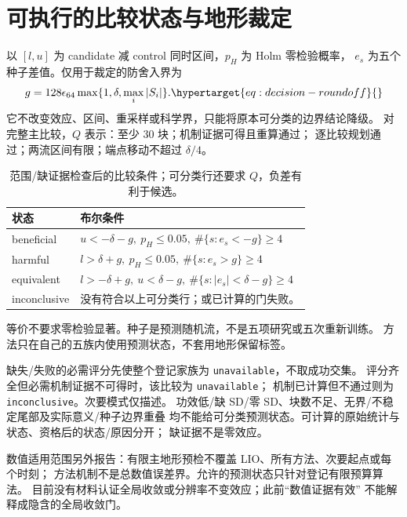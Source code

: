 \section{可执行的比较状态与地形裁定}
\label{sec:decision-conditions}\hypertarget{sec:decision-conditions}{}
以 \([l,u]\) 为 candidate 减 control 同时区间，\(p_H\) 为 Holm 零检验概率，
\(e_s\) 为五个种子差值。仅用于裁定的防舍入界为
\begin{equation}
 g=128\epsilon_{64}\max\{1,\delta,\max_i|S_i|\}.
 \label{eq:decision-roundoff}\hypertarget{eq:decision-roundoff}{}
\end{equation}
它不改变效应、区间、重采样或科学界，只能将原本可分类的边界结论降级。
对完整主比较，\(Q\) 表示：至少 30 块；机制证据可得且重算通过；
逐比较规划通过；两流区间有限；端点移动不超过 \(\delta/4\)。

\begin{table}[htbp]
\centering\small
\caption{范围/缺证据检查后的比较条件；可分类行还要求 \(Q\)，负差有利于候选。}
\label{tab:comparison-conditions}\hypertarget{tab:comparison-conditions}{}
\begin{tabular}{lp{4.8in}}
\toprule
状态 & 布尔条件\\
\midrule
beneficial & \(u<-\delta-g,\ p_H\leq0.05,\ \#\{s:e_s<-g\}\geq4\)\\
harmful & \(l>\delta+g,\ p_H\leq0.05,\ \#\{s:e_s>g\}\geq4\)\\
equivalent & \(l>-\delta+g,\ u<\delta-g,\ \#\{s:|e_s|<\delta-g\}\geq4\)\\
inconclusive & 没有符合以上可分类行；或已计算的门失败。\\
\bottomrule
\end{tabular}
\end{table}

等价不要求零检验显著。种子是预测随机流，不是五项研究或五次重新训练。
方法只在自己的五族内使用预测状态，不套用地形保留标签。

缺失/失败的必需评分先使整个登记家族为 \texttt{unavailable}，不取成功交集。
评分齐全但必需机制证据不可得时，该比较为 \texttt{unavailable}；
机制已计算但不通过则为 \texttt{inconclusive}。次要模式仅描述。
功效低/缺 SD/零 SD、块数不足、无界/不稳定尾部及实际意义/种子边界重叠
均不能给可分类预测状态。可计算的原始统计与状态、资格后的状态/原因分开；
缺证据不是零效应。

数值适用范围另外报告：有限主地形预检不覆盖 LIO、所有方法、次要起点或每个时刻；
方法机制不是总数值误差界。允许的预测状态只针对登记有限预算算法。
目前没有材料认证全局收敛或分辨率不变效应；此前“数值证据有效”
不能解释成隐含的全局收敛门。

